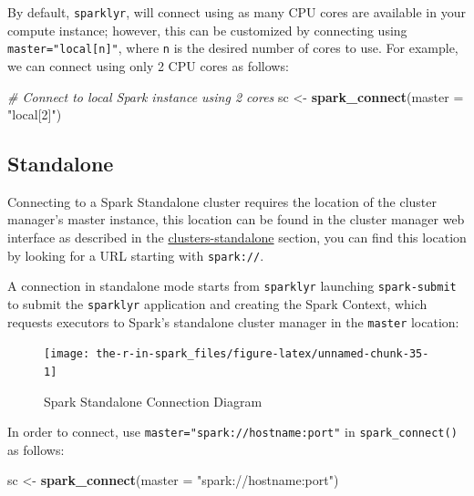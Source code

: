 \documentclass[]{book}
\newenvironment{Shaded}{\begin{snugshade}}{\end{snugshade}}
\newcommand{\CommentTok}[1]{\textcolor[rgb]{0.56,0.35,0.01}{\textit{#1}}}
\newcommand{\DataTypeTok}[1]{\textcolor[rgb]{0.13,0.29,0.53}{#1}}
\newcommand{\KeywordTok}[1]{\textcolor[rgb]{0.13,0.29,0.53}{\textbf{#1}}}
\newcommand{\NormalTok}[1]{#1}
\newcommand{\StringTok}[1]{\textcolor[rgb]{0.31,0.60,0.02}{#1}}
\theoremstyle{definition}
\theoremstyle{definition}
\theoremstyle{definition}
\theoremstyle{remark}
\begin{document}
By default, \texttt{sparklyr}, will connect using as many CPU cores are
available in your compute instance; however, this can be customized by
connecting using \texttt{master="local{[}n{]}"}, where \texttt{n} is the
desired number of cores to use. For example, we can connect using only 2
CPU cores as follows:

\begin{Shaded}
\begin{Highlighting}[]
\CommentTok{# Connect to local Spark instance using 2 cores}
\NormalTok{sc <-}\StringTok{ }\KeywordTok{spark_connect}\NormalTok{(}\DataTypeTok{master =} \StringTok{"local[2]"}\NormalTok{)}
\end{Highlighting}
\end{Shaded}

\hypertarget{standalone}{%
\subsection{Standalone}\label{standalone}}

Connecting to a Spark Standalone cluster requires the location of the
cluster manager's master instance, this location can be found in the
cluster manager web interface as described in the
\href{standalone\%20cluster}{clusters-standalone} section, you can find
this location by looking for a URL starting with \texttt{spark://}.

A connection in standalone mode starts from \texttt{sparklyr} launching
\texttt{spark-submit} to submit the \texttt{sparklyr} application and
creating the Spark Context, which requests executors to Spark's
standalone cluster manager in the \texttt{master} location:

\begin{figure}

{\centering \texttt{[image: the-r-in-spark\_files/figure-latex/unnamed-chunk-35-1]} 

}

\caption{Spark Standalone Connection Diagram}\label{fig:unnamed-chunk-35}
\end{figure}

In order to connect, use \texttt{master="spark://hostname:port"} in
\texttt{spark\_connect()} as follows:

\begin{Shaded}
\begin{Highlighting}[]
\NormalTok{sc <-}\StringTok{ }\KeywordTok{spark_connect}\NormalTok{(}\DataTypeTok{master =} \StringTok{"spark://hostname:port"}\NormalTok{)}
\end{Highlighting}
\end{Shaded}
\end{document}

